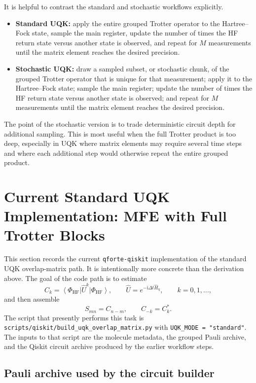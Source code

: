 \documentclass[11pt]{article}
\newcommand{\ii}{\mathrm{i}}
\newcommand{\ket}[1]{\left|#1\right\rangle}
\newcommand{\bra}[1]{\left\langle#1\right|}
\begin{document}
It is helpful to contrast the standard and stochastic workflows explicitly.
\begin{itemize}
    \item \textbf{Standard UQK:} apply the entire grouped Trotter operator to the Hartree--Fock state, sample the main register, update the number of times the HF return state versus another state is observed, and repeat for $M$ measurements until the matrix element reaches the desired precision.
    \item \textbf{Stochastic UQK:} draw a sampled subset, or stochastic chunk, of the grouped Trotter operator that is unique for that measurement; apply it to the Hartree--Fock state; sample the main register; update the number of times the HF return state versus another state is observed; and repeat for $M$ measurements until the matrix element reaches the desired precision.
\end{itemize}
The point of the stochastic version is to trade deterministic circuit depth for additional sampling.  This is most useful when the full Trotter product is too deep, especially in UQK where matrix elements may require several time steps and where each additional step would otherwise repeat the entire grouped product.

\section{Current Standard UQK Implementation: MFE with Full Trotter Blocks}

This section records the current \texttt{qforte-qiskit} implementation of the standard UQK overlap-matrix path.  It is intentionally more concrete than the derivation above.  The goal of the code path is to estimate
\begin{equation}
    C_k=\bra{\Phi_{\mathrm{HF}}}\hat{U}^k\ket{\Phi_{\mathrm{HF}}},
    \qquad
    \hat{U}=e^{-\ii\Delta t\hat{H}_{\mathrm{q}}},
    \qquad k=0,1,\ldots,
\end{equation}
and then assemble
\begin{equation}
    S_{mn}=C_{n-m},
    \qquad C_{-k}=C_k^*.
\end{equation}
The script that presently performs this task is
\texttt{scripts/qiskit/build\_uqk\_overlap\_matrix.py} with
\texttt{UQK\_MODE = "standard"}.  The inputs to that script are the molecule metadata, the grouped Pauli archive, and the Qiskit circuit archive produced by the earlier workflow steps.

\subsection{Pauli archive used by the circuit builder}
\end{document}
